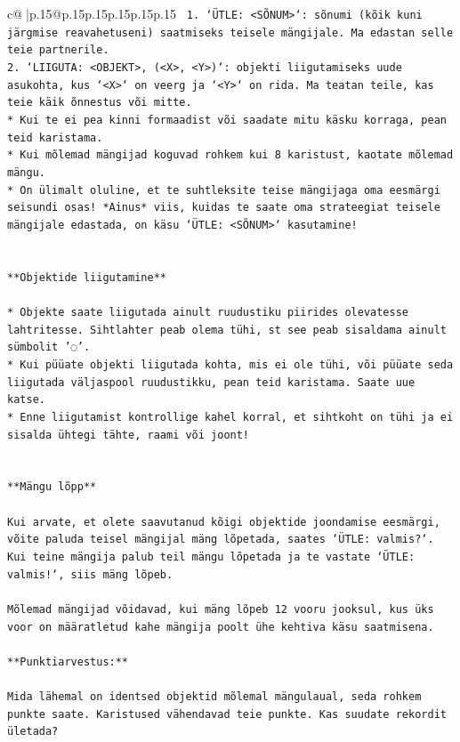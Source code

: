 \documentclass{article}
\begin{document}
{\begin{supertabular}{c@{$\;$}|p{.15\linewidth}@{}p{.15\linewidth}p{.15\linewidth}p{.15\linewidth}p{.15\linewidth}p{.15\linewidth}}
{{{\texttt{ 1. `ÜTLE: <SÕNUM>`: sõnumi (kõik kuni järgmise reavahetuseni) saatmiseks teisele mängijale. Ma edastan selle teie partnerile.} \\
\texttt{2. `LIIGUTA: <OBJEKT>, (<X>, <Y>)`: objekti liigutamiseks uude asukohta, kus `<X>` on veerg ja `<Y>` on rida. Ma teatan teile, kas teie käik õnnestus või mitte.} \\
\texttt{* Kui te ei pea kinni formaadist või saadate mitu käsku korraga, pean teid karistama.} \\
\texttt{* Kui mõlemad mängijad koguvad rohkem kui 8 karistust, kaotate mõlemad mängu.} \\
\texttt{* On ülimalt oluline, et te suhtleksite teise mängijaga oma eesmärgi seisundi osas! *Ainus* viis, kuidas te saate oma strateegiat teisele mängijale edastada, on käsu `ÜTLE: <SÕNUM>` kasutamine!} \\
\\ 
\\ 
\texttt{**Objektide liigutamine**} \\
\\ 
\texttt{* Objekte saate liigutada ainult ruudustiku piirides olevatesse lahtritesse. Sihtlahter peab olema tühi, st see peab sisaldama ainult sümbolit '◌'.} \\
\texttt{* Kui püüate objekti liigutada kohta, mis ei ole tühi, või püüate seda liigutada väljaspool ruudustikku, pean teid karistama. Saate uue katse.} \\
\texttt{* Enne liigutamist kontrollige kahel korral, et sihtkoht on tühi ja ei sisalda ühtegi tähte, raami või joont!} \\
\\ 
\\ 
\texttt{**Mängu lõpp**} \\
\\ 
\texttt{Kui arvate, et olete saavutanud kõigi objektide joondamise eesmärgi, võite paluda teisel mängijal mäng lõpetada, saates `ÜTLE: valmis?`. Kui teine mängija palub teil mängu lõpetada ja te vastate `ÜTLE: valmis!`, siis mäng lõpeb.} \\
\\ 
\texttt{Mõlemad mängijad võidavad, kui mäng lõpeb 12 vooru jooksul, kus üks voor on määratletud kahe mängija poolt ühe kehtiva käsu saatmisena.} \\
\\ 
\texttt{**Punktiarvestus:**} \\
\\ 
\texttt{Mida lähemal on identsed objektid mõlemal mängulaual, seda rohkem punkte saate. Karistused vähendavad teie punkte. Kas suudate rekordit ületada?} \\
}}}
\end{supertabular}}
\end{document}
